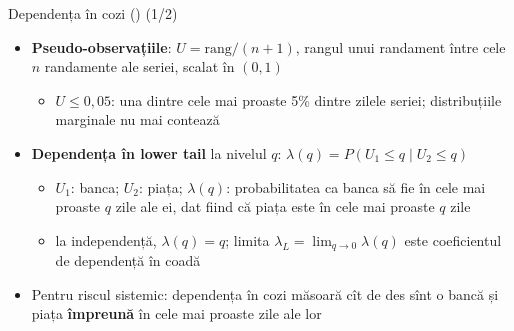 \begin{frame}{Dependența în cozi () (1/2)}
\itemsize{\small}
\begin{itemize}
    \item \textbf{Pseudo-observațiile}: $U = \text{rang}/(n + 1)$, rangul unui randament între cele $n$ randamente ale seriei, scalat în $(0, 1)$
    \begin{itemize}
        \item $U \le 0{,}05$: una dintre cele mai proaste 5\% dintre zilele seriei; distribuțiile marginale nu mai contează
    \end{itemize}
    \item \textbf{Dependența în lower tail} la nivelul $q$: $\lambda(q) = P(U_1 \le q \mid U_2 \le q)$
    \begin{itemize}
        \item $U_1$: banca; $U_2$: piața; $\lambda(q)$: probabilitatea ca banca să fie în cele mai proaste $q$ zile ale ei, dat fiind că piața este în cele mai proaste $q$ zile
        \item la independență, $\lambda(q) = q$; limita $\lambda_L = \lim_{q \to 0}\lambda(q)$ este coeficientul de dependență în coadă
    \end{itemize}
    \item Pentru riscul sistemic: dependența în cozi măsoară cît de des sînt o bancă și piața \textbf{împreună} în cele mai proaste zile ale lor
\end{itemize}
\end{frame}

